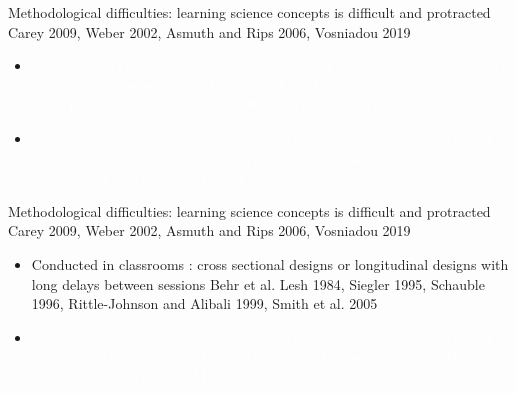 \documentclass[11pt]{beamer}
\begin{document}
                
                \begin{frame}
                  
                  Methodological difficulties: learning science concepts is difficult and protracted \footnotesize{Carey 2009, Weber 2002, Asmuth and Rips 2006, Vosniadou 2019}

                  \normalsize

                  \begin{itemize}

                    
                  \item{ \textcolor{white}{Conducted in classrooms : cross sectional designs or longitudinal designs with long delays between sessions \footnotesize{Behr et al. Lesh 1984,  Siegler 1995,  Schauble 1996, Rittle-Johnson and Alibali 1999, Smith et al. 2005}}}
                   
                  \normalsize

                \item{ \textcolor{white}{Lab experiment with simple learning target for example inferring a rule for categorizing images \footnotesize{Shepard 1961, Feldman 2000, Goodman et al. 2008, Ohlsson and Cosejo 2014, Marti et al. 2018}}}

                  \end{itemize}
                  
                \end{frame}

                \begin{frame}
                  
                  Methodological difficulties: learning science concepts is difficult and protracted \footnotesize{Carey 2009, Weber 2002, Asmuth and Rips 2006, Vosniadou 2019}

                  \normalsize

                  \begin{itemize}

                    
                 \item{ Conducted in classrooms : cross sectional designs or longitudinal designs with long delays between sessions
                   \footnotesize{Behr et al. Lesh 1984,  Siegler 1995,  Schauble 1996, Rittle-Johnson and Alibali 1999, Smith et al. 2005}}
                   
                  \normalsize

                \item{ \textcolor{white}{Lab experiment with simple learning target for example inferring a rule for categorizing images \footnotesize{Shepard 1961, Feldman 2000, Goodman et al. 2008, Ohlsson and Cosejo 2014, Marti et al. 2018}}}

                  \end{itemize}
                  
                \end{frame}
\end{document}
